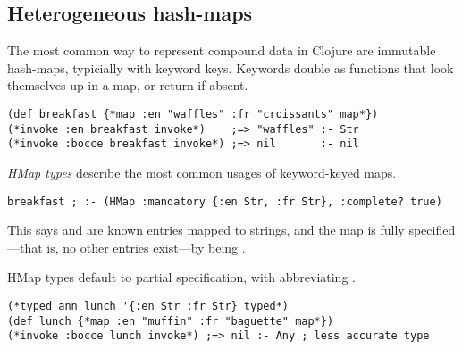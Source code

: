 %
%
%

\subsection{Heterogeneous hash-maps}

The most common way to represent compound data in Clojure 
are immutable hash-maps, typicially with keyword keys.
%
Keywords double as functions that
look themselves up in a map, or return  if absent.
%
\begin{exmp}
\begin{lstlisting}
(def breakfast {*map :en "waffles" :fr "croissants" map*})
(*invoke :en breakfast invoke*)    ;=> "waffles" :- Str
(*invoke :bocce breakfast invoke*) ;=> nil       :- nil
\end{lstlisting}
\label{example:breakfastcomplete}
\end{exmp}

\emph{HMap types} describe the most common usages of
keyword-keyed maps.
\begin{lstlisting}
breakfast ; :- (HMap :mandatory {:en Str, :fr Str}, :complete? true)
\end{lstlisting}
This says
 and  are known entries mapped to strings,
and the map is fully specified---that is, no other entries exist---by  being .

HMap types default to partial specification, with
 abbreviating .
%
\begin{exmp}
\begin{lstlisting}
(*typed ann lunch '{:en Str :fr Str} typed*)
(def lunch {*map :en "muffin" :fr "baguette" map*})
(*invoke :bocce lunch invoke*) ;=> nil :- Any ; less accurate type
\end{lstlisting}
\label{example:lunchpartial}
\end{exmp}

